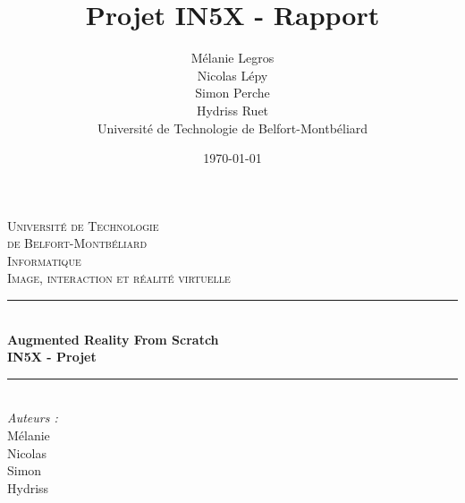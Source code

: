 \documentclass[a4paper, sans]{article}
\date{\today}
\author{Mélanie Legros \\ Nicolas Lépy \\ Simon Perche \\ Hydriss Ruet \\
Université de Technologie de Belfort-Montbéliard}
\title{Projet IN5X - Rapport}
\begin{document}
    \begin{titlepage}

      \newcommand{\HRule}{\rule{\linewidth}{0.5mm}} %
      
      \centering %
      
      
      \textsc{\LARGE Université de Technologie \\de Belfort-Montbéliard}\\[1.5cm] %
      \textsc{\Large Informatique}\\[0.5cm] %
      \textsc{\large Image, interaction et réalité virtuelle}\\[0.5cm] %
      
      
      \HRule \\[0.4cm]
      { \huge \bfseries Augmented Reality From Scratch\\IN5X - Projet}\\[0.4cm] %
      \HRule \\[1.5cm]
      

      
      \Large \emph{Auteurs :}\\
      Mélanie \\Nicolas {}\\Simon {}\\Hydriss {}\\[3cm] %
      
      

\end{titlepage}
\end{document}
